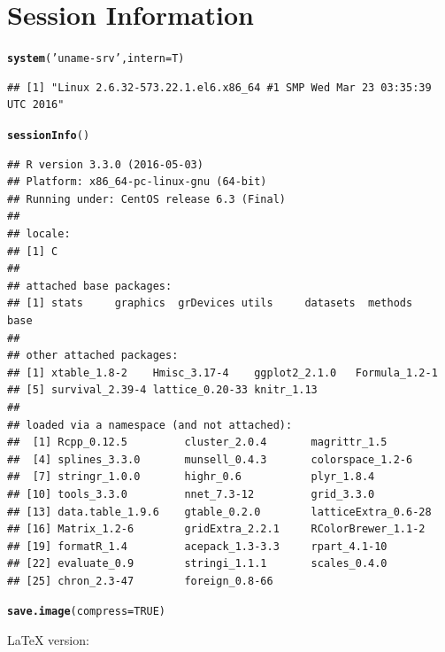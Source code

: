 \documentclass[8pt]{beamer}\usepackage[]{graphicx}\usepackage[]{color}
\makeatletter
\newcommand{\hlnum}[1]{\textcolor[rgb]{0.686,0.059,0.569}{#1}}%
\newcommand{\hlstr}[1]{\textcolor[rgb]{0.192,0.494,0.8}{#1}}%
\newcommand{\hlstd}[1]{\textcolor[rgb]{0.345,0.345,0.345}{#1}}%
\newcommand{\hlkwc}[1]{\textcolor[rgb]{0.333,0.667,0.333}{#1}}%
\newcommand{\hlkwd}[1]{\textcolor[rgb]{0.737,0.353,0.396}{\textbf{#1}}}%
\newenvironment{kframe}{%
 \def\at@end@of@kframe{}%
 \ifinner\ifhmode%
  \def\at@end@of@kframe{\end{minipage}}%
  \begin{minipage}{\columnwidth}%
 \fi\fi%
 \def\FrameCommand##1{\hskip\@totalleftmargin \hskip-\fboxsep
 \colorbox{shadecolor}{##1}\hskip-\fboxsep
     \hskip-\linewidth \hskip-\@totalleftmargin \hskip\columnwidth}%
 \MakeFramed {\advance\hsize-\width
   \@totalleftmargin\z@ \linewidth\hsize
   \@setminipage}}%
 {\par\unskip\endMakeFramed%
 \at@end@of@kframe}
\newenvironment{knitrout}{}{} %
\makeatother
\begin{document}
\section{Session Information}
\begin{knitrout}\footnotesize
{}\color{fgcolor}\begin{kframe}
\begin{alltt}
\hlkwd{system}\hlstd{(}\hlstr{'uname -srv'}\hlstd{,}\hlkwc{intern}\hlstd{=T)}
\end{alltt}
\begin{verbatim}
## [1] "Linux 2.6.32-573.22.1.el6.x86_64 #1 SMP Wed Mar 23 03:35:39 UTC 2016"
\end{verbatim}
\begin{alltt}
\hlkwd{sessionInfo}\hlstd{()}
\end{alltt}
\begin{verbatim}
## R version 3.3.0 (2016-05-03)
## Platform: x86_64-pc-linux-gnu (64-bit)
## Running under: CentOS release 6.3 (Final)
## 
## locale:
## [1] C
## 
## attached base packages:
## [1] stats     graphics  grDevices utils     datasets  methods   base     
## 
## other attached packages:
## [1] xtable_1.8-2    Hmisc_3.17-4    ggplot2_2.1.0   Formula_1.2-1  
## [5] survival_2.39-4 lattice_0.20-33 knitr_1.13     
## 
## loaded via a namespace (and not attached):
##  [1] Rcpp_0.12.5         cluster_2.0.4       magrittr_1.5       
##  [4] splines_3.3.0       munsell_0.4.3       colorspace_1.2-6   
##  [7] stringr_1.0.0       highr_0.6           plyr_1.8.4         
## [10] tools_3.3.0         nnet_7.3-12         grid_3.3.0         
## [13] data.table_1.9.6    gtable_0.2.0        latticeExtra_0.6-28
## [16] Matrix_1.2-6        gridExtra_2.2.1     RColorBrewer_1.1-2 
## [19] formatR_1.4         acepack_1.3-3.3     rpart_4.1-10       
## [22] evaluate_0.9        stringi_1.1.1       scales_0.4.0       
## [25] chron_2.3-47        foreign_0.8-66
\end{verbatim}
\begin{alltt}
\hlkwd{save.image}\hlstd{(}\hlkwc{compress} \hlstd{=} \hlnum{TRUE}\hlstd{)}
\end{alltt}
\end{kframe}
\end{knitrout}
\scriptsize{\LaTeX{} version: \LaTeXe~ \fmtversion}
\end{document}
